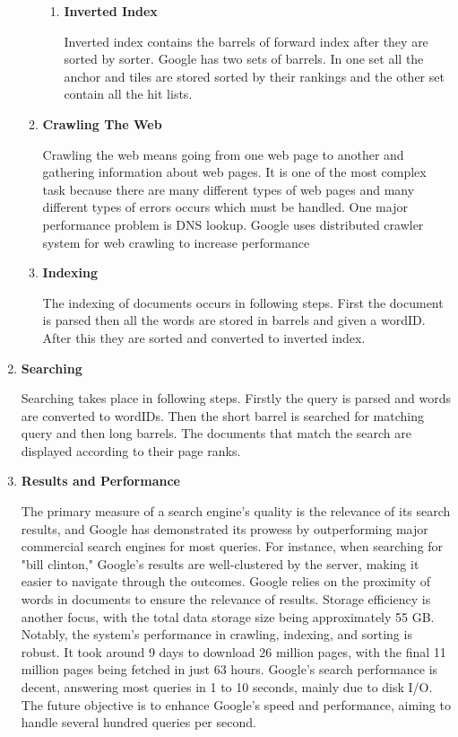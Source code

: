 \documentclass[a4paper, 12pt]{article}
\begin{document}
\begin{enumerate}
\begin{enumerate}
\begin{enumerate}
            \item \textbf{Inverted Index}
                Inverted index contains the barrels of forward index after they are sorted by sorter. Google has two sets of barrels. In one set all the anchor and tiles are stored sorted by their rankings and the other set contain all the hit lists.
        \end{enumerate}
        \item \textbf{Crawling The Web}
            Crawling the web means going from one web page to another and gathering information about web pages. It is one of the most complex task because there are many different types of web pages and many different types of errors occurs which must be handled. One major performance problem is DNS lookup. Google uses distributed crawler system for web crawling to increase performance
        \item \textbf{Indexing}
            The indexing of documents occurs in following steps. First the document is parsed then all the words are stored in barrels and given a wordID. After this they are sorted and converted to inverted index.
        \end{enumerate}
    \newpage
    \item \textbf{Searching}
        Searching takes place in following steps. Firstly the query is parsed and words are converted to wordIDs. Then the short barrel is searched for matching query and then long barrels. The documents that match the search are displayed according to their page ranks.
    \item \textbf{Results and Performance}
         The primary measure of a search engine's quality is the relevance of its search results, and Google has demonstrated its prowess by outperforming major commercial search engines for most queries. For instance, when searching for "bill clinton," Google's results are well-clustered by the server, making it easier to navigate through the outcomes. Google relies on the proximity of words in documents to ensure the relevance of results. Storage efficiency is another focus, with the total data storage size being approximately 55 GB. Notably, the system's performance in crawling, indexing, and sorting is robust. It took around 9 days to download 26 million pages, with the final 11 million pages being fetched in just 63 hours. Google's search performance is decent, answering most queries in 1 to 10 seconds, mainly due to disk I/O. The future objective is to enhance Google's speed and performance, aiming to handle several hundred queries per second.
\end{enumerate}
\end{document}
